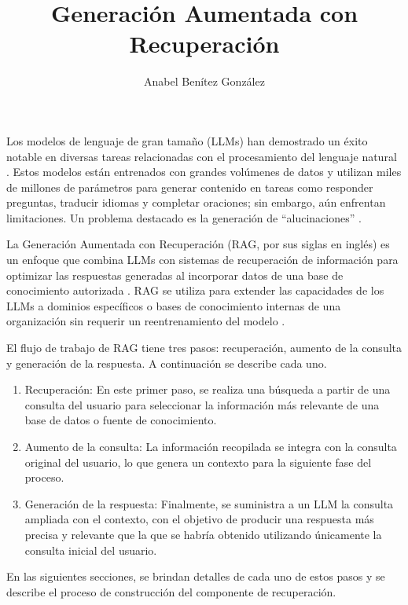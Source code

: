 \documentclass{article}
\title{Generación Aumentada con Recuperación}
\author{Anabel Benítez González}
\date{}
\begin{document}
\tableofcontents 

\maketitle

Los modelos de lenguaje de gran tamaño (LLMs) han demostrado un éxito notable en diversas tareas relacionadas con el procesamiento del lenguaje natural \cite{makridakis2023largelanguagemodels}. Estos modelos están entrenados con grandes volúmenes de datos y utilizan miles de millones de parámetros para generar contenido en tareas como responder preguntas, traducir idiomas y completar oraciones; sin embargo, aún enfrentan limitaciones. Un problema destacado es la generación de ``alucinaciones'' \cite{zhang2023sirenssongaiocean}.

La Generación Aumentada con Recuperación (RAG, por sus siglas en inglés) es un enfoque que combina LLMs con sistemas de recuperación de información para optimizar las respuestas generadas al incorporar datos de una base de conocimiento autorizada \cite{gao2024retrievalaugmentedgenerationlargelanguage}. RAG se utiliza para extender las capacidades de los LLMs a dominios específicos o bases de conocimiento internas de una organización sin requerir un reentrenamiento del modelo \cite{gao2024retrievalaugmentedgenerationlargelanguage}.

El flujo de trabajo de RAG tiene tres pasos: recuperación, aumento de la consulta y generación de la respuesta. A continuación se describe cada uno.
\begin{enumerate}
     \item Recuperación: En este primer paso, se realiza una búsqueda a partir de una consulta del usuario para seleccionar la información más relevante de una base de datos o fuente de conocimiento.
    \item Aumento de la consulta: La información recopilada se integra con la consulta original del usuario, lo que genera un contexto para la siguiente fase del proceso.
    \item Generación de la respuesta: Finalmente, se suministra a un LLM la consulta ampliada con el contexto, con el objetivo de producir una respuesta más precisa y relevante que la que se habría obtenido utilizando únicamente la consulta inicial del usuario.
\end{enumerate}

En las siguientes secciones, se brindan detalles de cada uno de estos pasos y se describe el proceso de construcción del componente de recuperación. 
\end{document}
